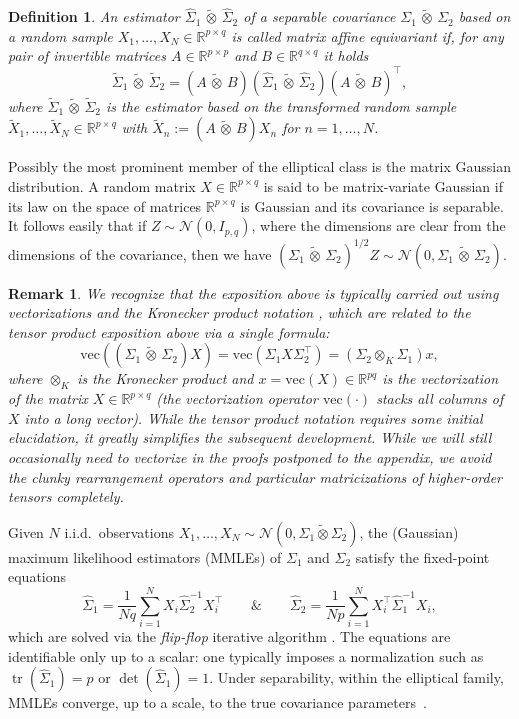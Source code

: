 \documentclass[12pt]{article}
\newcommand{\R}{\mathbb{R}}
\renewcommand{\vec}{\mathrm{vec}}
\newcommand{\tr}{\operatorname{tr}}
\newcommand{\ot}{\,\tilde\otimes\,}
\newcommand{\mmle}{\widehat \Sigma_1 \ot \widehat \Sigma_2}
\newtheorem{definition}{Definition}
\newtheorem{remark}{Remark}
\begin{document}
\begin{definition}\label{def:equivariance}
    An estimator $\mmle$ of a separable covariance $\Sigma_1\ot\Sigma_2$ based on a random sample $X_1,\ldots,X_N \in \R^{p \times q}$ is called \emph{matrix affine equivariant} if, for any pair of invertible matrices $A \in \mathbb{R}^{p \times p}$ and $B \in \mathbb{R}^{q \times q}$ it holds
\[
\widetilde{\Sigma}_1 \ot \widetilde{\Sigma}_2 = (A \ot B) (\widehat{\Sigma}_1 \ot \widehat{\Sigma}_2) (A \ot B)^\top,
\]
where $\widetilde{\Sigma}_1 \ot \widetilde{\Sigma}_2$ is the estimator based on the transformed random sample $\widetilde X_1,\ldots,\widetilde X_N \in \R^{p \times q}$ with $\widetilde X_n := (A \ot B)X_n$ for $n=1,\ldots,N$.
\end{definition}


Possibly the most prominent member of the elliptical class is the matrix Gaussian distribution. A random matrix $X \in \R^{p \times q}$ is said to be matrix-variate Gaussian if its law on the space of matrices $\R^{p \times q}$ is Gaussian and its covariance is separable. It follows easily that if $Z \sim \mathcal{N}(0, I_{p,q})$, where the dimensions are clear from the dimensions of the covariance, then we have $(\Sigma_1 \ot \Sigma_2)^{1/2} Z \sim \mathcal{N}(0, \Sigma_1 \ot \Sigma_2)$.

\begin{remark}
We recognize that the exposition above is typically carried out using vectorizations \citep[see e.g.][]{gupta2018} and the Kronecker product notation \citep{van2000ubiquitous}, which are related to the tensor product exposition above via a single formula:
\[
\vec((\Sigma_1 \ot \Sigma_2)X) = \vec(\Sigma_1 X \Sigma_2^\top) = (\Sigma_2 \otimes_{K} \Sigma_1)x,
\]
where $\otimes_{K}$ is the Kronecker product and $x = \vec(X) \in \R^{pq}$ is the vectorization of the matrix $X \in \R^{p \times q}$ (the vectorization operator $\vec(\cdot)$ stacks all columns of $X$ into a long vector). While the tensor product notation requires some initial elucidation, it greatly simplifies the subsequent development. While we will still occasionally need to vectorize in the proofs postponed to the appendix, we avoid the clunky rearrangement operators \citep{van1993approximation} and particular matricizations of higher-order tensors completely.
\end{remark}


Given $N$ i.i.d.\ observations $X_1,\ldots,X_N \sim \mathcal{N}(0,\Sigma_1 \tilde\otimes \Sigma_2)$, the (Gaussian) maximum likelihood estimators (MMLEs) of $\Sigma_1$ and $\Sigma_2$ satisfy the fixed-point equations
\begin{equation}\label{eq:mmle}
\hat\Sigma_1 = \frac{1}{Nq}\sum_{i=1}^N X_i \hat\Sigma_2^{-1} X_i^\top\qquad\&\qquad \hat\Sigma_2 = \frac{1}{Np}\sum_{i=1}^N X_i^\top \hat\Sigma_1^{-1} X_i,
\end{equation}
which are solved via the \emph{flip-flop} iterative algorithm \citep{dutilleul1999mle, srivastava2008}. The equations are identifiable only up to a scalar: one typically imposes a normalization such as $\tr(\hat\Sigma_1)=p$ or $\det(\hat\Sigma_1)=1$. Under separability, within the elliptical family, MMLEs converge, up to a scale, to the true covariance parameters~\citep{MMCD}.
\end{document}
